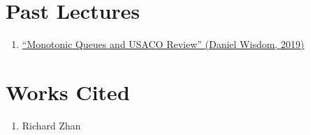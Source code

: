 \documentclass[11pt, oneside]{article}
\begin{document}
\section{Past Lectures}

\begin{enumerate}
  \item \href{https://activities.tjhsst.edu/sct/lectures/1819/2019_1_8_Monotonic_Queues_and_USACO_Review.pdf}{``Monotonic Queues and USACO Review'' (Daniel Wisdom, 2019)}
\end{enumerate}

\section{Works Cited}

\begin{enumerate}
  \item Richard Zhan
\end{enumerate}
\end{document}
